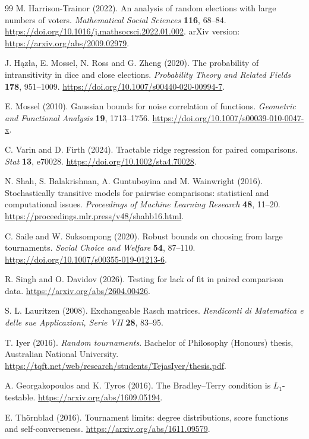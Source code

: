\documentclass[11pt,a4paper]{article}
\theoremstyle{definition}
\begin{document}
\begin{thebibliography}{99}
 M. Harrison-Trainor (2022).
An analysis of random elections with large numbers of voters.
\emph{Mathematical Social Sciences} \textbf{116}, 68--84.
\url{https://doi.org/10.1016/j.mathsocsci.2022.01.002}.
arXiv version: \url{https://arxiv.org/abs/2009.02979}.

 J. H\k{a}z\l{}a, E. Mossel, N. Ross and G. Zheng (2020).
The probability of intransitivity in dice and close elections.
\emph{Probability Theory and Related Fields} \textbf{178}, 951--1009.
\url{https://doi.org/10.1007/s00440-020-00994-7}.

 E. Mossel (2010).
Gaussian bounds for noise correlation of functions.
\emph{Geometric and Functional Analysis} \textbf{19}, 1713--1756.
\url{https://doi.org/10.1007/s00039-010-0047-x}.

 C. Varin and D. Firth (2024).
Tractable ridge regression for paired comparisons.
\emph{Stat} \textbf{13}, e70028.
\url{https://doi.org/10.1002/sta4.70028}.

 N. Shah, S. Balakrishnan, A. Guntuboyina and M. Wainwright (2016).
Stochastically transitive models for pairwise comparisons: statistical and computational issues.
\emph{Proceedings of Machine Learning Research} \textbf{48}, 11--20.
\url{https://proceedings.mlr.press/v48/shahb16.html}.

 C. Saile and W. Suksompong (2020).
Robust bounds on choosing from large tournaments.
\emph{Social Choice and Welfare} \textbf{54}, 87--110.
\url{https://doi.org/10.1007/s00355-019-01213-6}.

 R. Singh and O. Davidov (2026).
Testing for lack of fit in paired comparison data.
\url{https://arxiv.org/abs/2604.00426}.

 S. L. Lauritzen (2008).
Exchangeable Rasch matrices. \emph{Rendiconti di Matematica e delle sue Applicazioni, Serie VII}
\textbf{28}, 83--95.

 T. Iyer (2016).
\emph{Random tournaments}. Bachelor of Philosophy (Honours) thesis,
Australian National University.
\url{https://tqft.net/web/research/students/TejasIyer/thesis.pdf}.

 A. Georgakopoulos and K. Tyros (2016).
The Bradley--Terry condition is $L_1$-testable.
\url{https://arxiv.org/abs/1609.05194}.

 E. Th\"ornblad (2016).
Tournament limits: degree distributions, score functions and self-converseness.
\url{https://arxiv.org/abs/1611.09579}.


\end{thebibliography}
\end{document}
